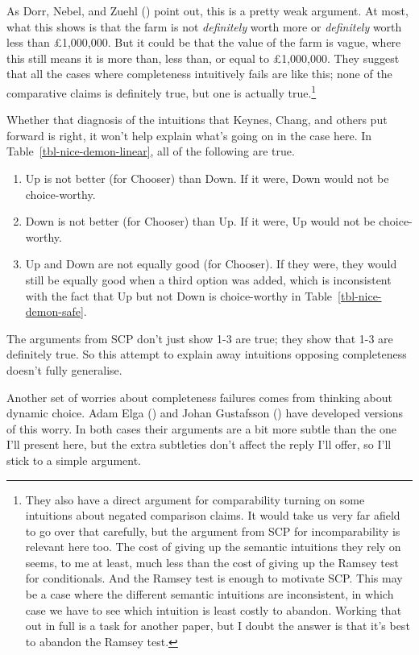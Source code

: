\documentclass[
  10pt,
  letterpaper,
  DIV=11,
  numbers=noendperiod,
  twoside]{scrartcl}
\providecommand{\tightlist}{%
  \setlength{\itemsep}{0pt}\setlength{\parskip}{0pt}}\usepackage{longtable,booktabs,array}
\begin{document}
As Dorr, Nebel, and Zuehl ()
point out, this is a pretty weak argument. At most, what this shows is
that the farm is not \emph{definitely} worth more or \emph{definitely}
worth less than £1,000,000. But it could be that the value of the farm
is vague, where this still means it is more than, less than, or equal to
£1,000,000. They suggest that all the cases where completeness
intuitively fails are like this; none of the comparative claims is
definitely true, but one is actually true.\footnote{They also have a
  direct argument for comparability turning on some intuitions about
  negated comparison claims. It would take us very far afield to go over
  that carefully, but the argument from SCP for incomparability is
  relevant here too. The cost of giving up the semantic intuitions they
  rely on seems, to me at least, much less than the cost of giving up
  the Ramsey test for conditionals. And the Ramsey test is enough to
  motivate SCP. This may be a case where the different semantic
  intuitions are inconsistent, in which case we have to see which
  intuition is least costly to abandon. Working that out in full is a
  task for another paper, but I doubt the answer is that it's best to
  abandon the Ramsey test.}

Whether that diagnosis of the intuitions that Keynes, Chang, and others
put forward is right, it won't help explain what's going on in the case
here. In Table~\ref{tbl-nice-demon-linear}, all of the following are
true.

\begin{enumerate}
\def\labelenumi{\arabic{enumi}.}
\tightlist
\item
  Up is not better (for Chooser) than Down. If it were, Down would not
  be choice-worthy.
\item
  Down is not better (for Chooser) than Up. If it were, Up would not be
  choice-worthy.
\item
  Up and Down are not equally good (for Chooser). If they were, they
  would still be equally good when a third option was added, which is
  inconsistent with the fact that Up but not Down is choice-worthy in
  Table~\ref{tbl-nice-demon-safe}.
\end{enumerate}

The arguments from SCP don't just show 1-3 are true; they show that 1-3
are definitely true. So this attempt to explain away intuitions opposing
completeness doesn't fully generalise.

Another set of worries about completeness failures comes from thinking
about dynamic choice. Adam Elga () and
Johan Gustafsson () have developed
versions of this worry. In both cases their arguments are a bit more
subtle than the one I'll present here, but the extra subtleties don't
affect the reply I'll offer, so I'll stick to a simple argument.
\end{document}
